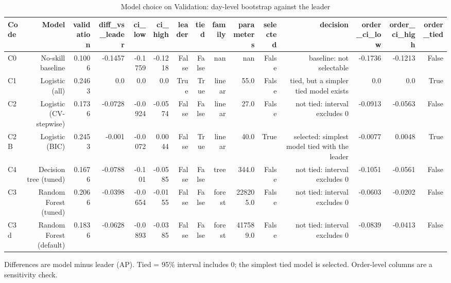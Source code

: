 \begin{table}[htbp]
\centering
\small
\caption{Model choice on Validation: day-level bootstrap against the leader}
\begin{tabular}{lrrrrrrrrrrrrrr}
\toprule
Code & Model & validation & diff\_vs\_leader & ci\_low & ci\_high & leader & tied & family & parameters & selected & decision & order\_ci\_low & order\_ci\_high & order\_tied \\
\midrule
C0 & No-skill baseline & 0.1006 & -0.1457 & -0.1759 & -0.1218 & False & False & nan & nan & False & baseline: not selectable & -0.1736 & -0.1213 & False \\
C1 & Logistic (all) & 0.2463 & 0.0 & 0.0 & 0.0 & True & True & linear & 55.0 & False & tied, but a simpler tied model exists & 0.0 & 0.0 & True \\
C2 & Logistic (CV-stepwise) & 0.1736 & -0.0728 & -0.0924 & -0.0574 & False & False & linear & 27.0 & False & not tied: interval excludes 0 & -0.0913 & -0.0563 & False \\
C2B & Logistic (BIC) & 0.2453 & -0.001 & -0.0072 & 0.0044 & False & True & linear & 40.0 & True & selected: simplest model tied with the leader & -0.0077 & 0.0048 & True \\
C4 & Decision tree (tuned) & 0.1676 & -0.0788 & -0.101 & -0.0585 & False & False & tree & 344.0 & False & not tied: interval excludes 0 & -0.1051 & -0.0561 & False \\
C3 & Random Forest (tuned) & 0.2066 & -0.0398 & -0.0654 & -0.0155 & False & False & forest & 228205.0 & False & not tied: interval excludes 0 & -0.0603 & -0.0202 & False \\
C3d & Random Forest (default) & 0.1836 & -0.0628 & -0.0893 & -0.0385 & False & False & forest & 417589.0 & False & not tied: interval excludes 0 & -0.0839 & -0.0413 & False \\
\bottomrule
\end{tabular}
\par\smallskip\begin{minipage}{\linewidth}\footnotesize Differences are model minus leader (AP). Tied = 95\% interval includes 0; the simplest tied model is selected. Order-level columns are a sensitivity check.\end{minipage}
\end{table}

